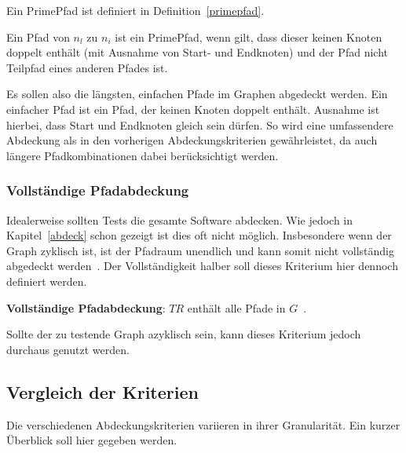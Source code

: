 Ein PrimePfad ist definiert in Definition~\ref{primepfad}.

\begin{definition}
    Ein Pfad von $n_{l}$ zu $n_{i}$ ist ein PrimePfad, wenn gilt, dass dieser keinen Knoten doppelt enthält (mit Ausnahme von Start- und Endknoten) und
    der Pfad nicht Teilpfad eines anderen Pfades ist.
    \label{primepfad}
\end{definition}

Es sollen also die längsten, einfachen Pfade im Graphen abgedeckt werden.
Ein einfacher Pfad ist ein Pfad, der keinen Knoten doppelt enthält.
Ausnahme ist hierbei, dass Start und Endknoten gleich sein dürfen.
So wird eine umfassendere Abdeckung als in den vorherigen Abdeckungskriterien gewährleistet, da auch längere Pfadkombinationen dabei berücksichtigt werden.

\subsubsection{Vollständige Pfadabdeckung}

Idealerweise sollten Tests die gesamte Software abdecken.
Wie jedoch in Kapitel~\ref{abdeck} schon gezeigt ist dies oft nicht möglich.
Insbesondere wenn der Graph zyklisch ist, ist der Pfadraum unendlich und kann somit nicht vollständig abgedeckt werden~\cite[vgl. S. 36 ]{software-testing}.
Der Vollständigkeit halber soll dieses Kriterium hier dennoch definiert werden.

\begin{definition}
    \textbf{Vollständige Pfadabdeckung}: $TR$ enthält alle Pfade in $G$~\cite[vgl. Criterion 2.7]{software-testing}.
    \label{completecov}
\end{definition}

Sollte der zu testende Graph azyklisch sein, kann dieses Kriterium jedoch durchaus genutzt werden.

\subsection{Vergleich der Kriterien}

Die verschiedenen Abdeckungskriterien variieren in ihrer Granularität.
Ein kurzer Überblick soll hier gegeben werden.

